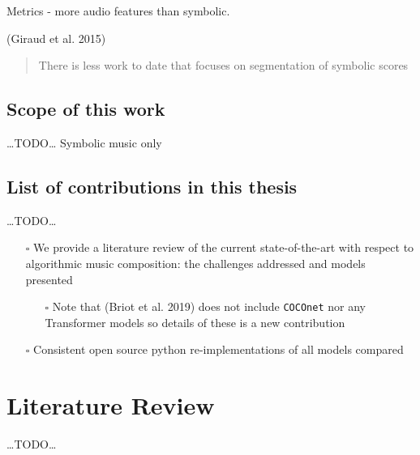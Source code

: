 \documentclass[12pt,a4paper,]{report}
\providecommand{\tightlist}{%
  \setlength{\itemsep}{0pt}\setlength{\parskip}{0pt}}
\begin{document}
Metrics - more audio features than symbolic.

(Giraud et al. 2015)

\begin{quote}
There is less work to date that focuses on segmentation of symbolic
scores
\end{quote}

\hypertarget{scope-of-this-work}{%
\section{Scope of this work}\label{scope-of-this-work}}

\ldots TODO\ldots{} Symbolic music only

\hypertarget{list-of-contributions-in-this-thesis}{%
\section{List of contributions in this
thesis}\label{list-of-contributions-in-this-thesis}}

\ldots TODO\ldots{}

\begin{itemize}
\tightlist
\item[$\square$]
  We provide a literature review of the current state-of-the-art with
  respect to algorithmic music composition: the challenges addressed and
  models presented

  \begin{itemize}
  \tightlist
  \item[$\square$]
    Note that (Briot et al. 2019) does not include \texttt{COCOnet} nor
    any Transformer models so details of these is a new contribution
  \end{itemize}
\item[$\square$]
  Consistent open source python re-implementations of all models
  compared
\end{itemize}

\hypertarget{literature-review}{%
\chapter{Literature Review}\label{literature-review}}

\ldots TODO\ldots{}
\end{document}
